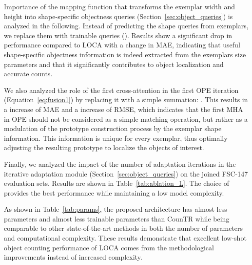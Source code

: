 \documentclass[10pt,twocolumn,letterpaper]{article}
\begin{document}
Importance of the mapping function that transforms the exemplar width and height into shape-specific objectness queries (Section~\ref{sec:object_queries}) is analyzed in the following. 
Instead of predicting the shape queries from exemplars, we replace them with trainable queries (). 
Results show a significant drop in performance compared to LOCA with a  change in MAE, indicating that useful shape-specific objectness information is indeed extracted from the exemplars size parameters and that it significantly contributes to object localization and accurate counts.

We also analyzed the role of the first cross-attention in the first OPE iteration (Equation~\ref{eq:fusion1}) by replacing it with a simple summation:
.
This results in a  increase of MAE and a  increase of RMSE, which indicates that the first MHA in OPE should not be considered as a simple matching operation, but rather as a modulation of the prototype construction process by the exemplar shape information.
This information is unique for every exemplar, thus optimally adjusting the resulting prototype to localize the objects of interest. 



Finally, we analyzed the impact of the number of adaptation iterations  in the iterative adaptation module (Section~\ref{sec:object_queries}) on the joined FSC-147 evaluation sets. 
Results are shown in Table~\ref{tab:ablation_L}. 
The choice of  provides the best performance while maintaining a low model complexity.

 As shown in Table~\ref{tab:params}, the proposed architecture has almost  less parameters and almost  less trainable parameters than CounTR while being comparable to other state-of-the-art methods in both the number of parameters and computational complexity.
These results demonstrate that excellent low-shot object counting performance of LOCA comes from the methodological improvements instead of increased complexity.
\end{document}
